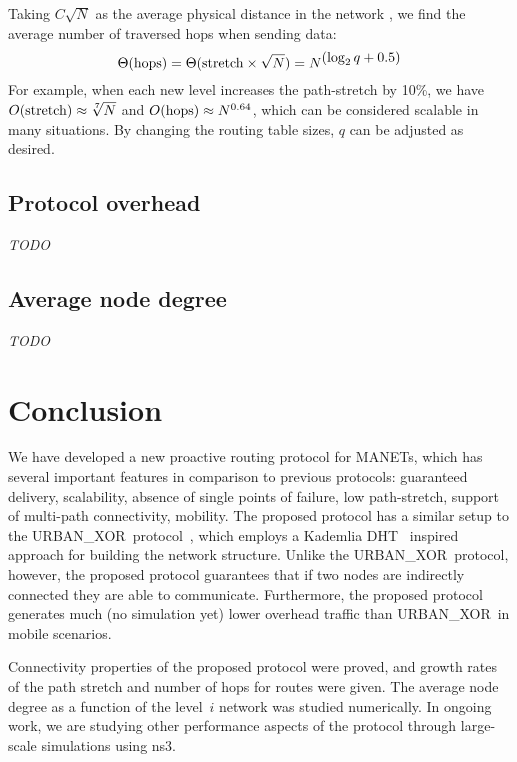 \documentclass[conference]{IEEEtran}
\theoremstyle{definition}
\newcommand{\urbanxor}{URBAN\_XOR}
\begin{document}
Taking $C\sqrt{N}$ as the average physical distance in the network \cite{Kleinrock}, we find the average number of traversed hops when sending data:
\begin{equation*}
    \Theta({\rm hops}) = \Theta( {\rm stretch} \times \sqrt{N}) = N^{\displaystyle (\log_2 q + 0.5)}
\end{equation*}
For example, when each new level increases the path-stretch by 10\%, we have $O({\rm stretch}) \approx \sqrt[7]{N}$ and $O({\rm hops}) \approx N^{0.64}$, which can be considered scalable in many situations. By changing the routing table sizes, $q$ can be adjusted as desired.


\subsection{Protocol overhead}
\label{sec:analysis:overhead}
\emph{TODO}


\subsection{Average node degree}
\label{sec:analysis:nodedegree}
\emph{TODO}


\section{Conclusion}
\label{sec:conclusion}

We have developed a new proactive routing protocol for MANETs, which has several important features in comparison to previous protocols: guaranteed delivery, scalability, absence of single points of failure, low path-stretch, support of multi-path connectivity, {\color{orange}mobility}. The proposed protocol has a similar setup to the \urbanxor\ protocol~\cite{Pasquini}, which employs a Kademlia DHT~\cite{kademlia} inspired approach for building the network structure. Unlike the \urbanxor\ protocol, however, the proposed protocol guarantees that if two nodes are indirectly connected they are able to communicate. Furthermore, the proposed protocol generates {\color{orange}much (no simulation yet)} lower overhead traffic than \urbanxor\ in mobile scenarios.  

Connectivity properties of the proposed protocol were proved, and growth rates of the path stretch and number of hops for routes were given. The average node degree as a function of the level~$i$ network was studied numerically. In ongoing work, we are studying other performance aspects of the protocol through large-scale simulations {\color{orange}using ns3}.




\end{document}
